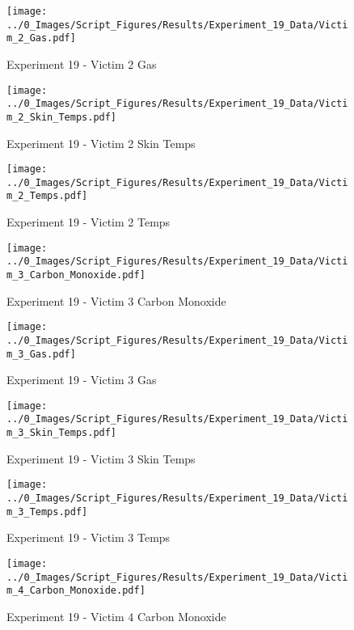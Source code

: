	\begin{figure}[H]
		\centering
		\texttt{[image: ../0\_Images/Script\_Figures/Results/Experiment\_19\_Data/Victim\_2\_Gas.pdf]}
		\caption[]{Experiment 19 - Victim 2 Gas}
	\end{figure}
 
	\clearpage

	\begin{figure}[H]
		\centering
		\texttt{[image: ../0\_Images/Script\_Figures/Results/Experiment\_19\_Data/Victim\_2\_Skin\_Temps.pdf]}
		\caption[]{Experiment 19 - Victim 2 Skin Temps}
	\end{figure}
 

	\begin{figure}[H]
		\centering
		\texttt{[image: ../0\_Images/Script\_Figures/Results/Experiment\_19\_Data/Victim\_2\_Temps.pdf]}
		\caption[]{Experiment 19 - Victim 2 Temps}
	\end{figure}
 
	\clearpage

	\begin{figure}[H]
		\centering
		\texttt{[image: ../0\_Images/Script\_Figures/Results/Experiment\_19\_Data/Victim\_3\_Carbon\_Monoxide.pdf]}
		\caption[]{Experiment 19 - Victim 3 Carbon Monoxide}
	\end{figure}
 

	\begin{figure}[H]
		\centering
		\texttt{[image: ../0\_Images/Script\_Figures/Results/Experiment\_19\_Data/Victim\_3\_Gas.pdf]}
		\caption[]{Experiment 19 - Victim 3 Gas}
	\end{figure}
 
	\clearpage

	\begin{figure}[H]
		\centering
		\texttt{[image: ../0\_Images/Script\_Figures/Results/Experiment\_19\_Data/Victim\_3\_Skin\_Temps.pdf]}
		\caption[]{Experiment 19 - Victim 3 Skin Temps}
	\end{figure}
 

	\begin{figure}[H]
		\centering
		\texttt{[image: ../0\_Images/Script\_Figures/Results/Experiment\_19\_Data/Victim\_3\_Temps.pdf]}
		\caption[]{Experiment 19 - Victim 3 Temps}
	\end{figure}
 
	\clearpage

	\begin{figure}[H]
		\centering
		\texttt{[image: ../0\_Images/Script\_Figures/Results/Experiment\_19\_Data/Victim\_4\_Carbon\_Monoxide.pdf]}
		\caption[]{Experiment 19 - Victim 4 Carbon Monoxide}
	\end{figure}
 

